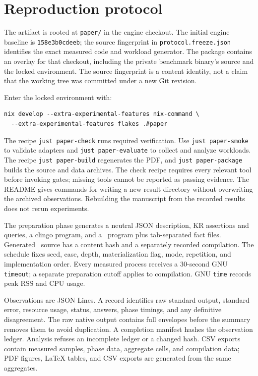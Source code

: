 \section{Reproduction protocol}
\label{app:reproduce}

The artifact is rooted at \texttt{paper/} in the engine checkout. The initial
engine baseline is \texttt{158e3b0cdeeb}; the source fingerprint in
\texttt{protocol.freeze.json} identifies the exact measured code and workload
generator. The package contains an overlay for that checkout, including the
private benchmark binary's source and the locked environment. The source
fingerprint is a content identity, not a claim that the working tree was
committed under a new Git revision.

Enter the locked environment with:
\begin{lstlisting}[style=kr]
nix develop --extra-experimental-features nix-command \
  --extra-experimental-features flakes .#paper
\end{lstlisting}
The recipe \texttt{just paper-check} runs required verification.
Use \texttt{just paper-smoke} to validate adapters and
\texttt{just paper-evaluate} to collect and analyze workloads.
The recipe \texttt{just paper-build} regenerates the PDF, and
\texttt{just paper-package} builds the source and data archives.
The check recipe requires every relevant tool before invoking gates; missing
tools cannot be reported as passing evidence. The README gives commands for
writing a new result directory without overwriting the archived observations.
Rebuilding the manuscript from the recorded results does not rerun experiments.

The preparation phase generates a neutral JSON description, KR assertions and
queries, a clingo program, and a \Souffle\ program plus tab-separated fact
files. Generated \Souffle\ source has a content hash and a separately recorded
compilation. The schedule fixes seed, case, depth, materialization flag, mode,
repetition, and implementation order. Every measured process receives a
30-second GNU \texttt{timeout}; a separate preparation cutoff applies to
compilation. GNU \texttt{time} records peak RSS and CPU usage.

Observations are JSON Lines. A record identifies raw standard output, standard
error, resource usage, status, answers, phase timings, and any definitive
disagreement. The raw native output contains full envelopes before the summary
removes them to avoid duplication. A completion manifest hashes the observation
ledger. Analysis refuses an incomplete ledger or a changed hash. CSV exports
contain measured samples, phase data, aggregate cells, and compilation data;
PDF figures, LaTeX tables, and CSV exports are generated from the same aggregates.

